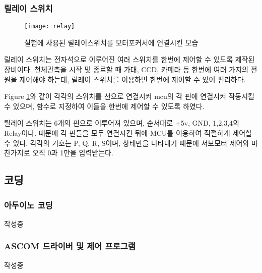 

\subsubsection{릴레이 스위치}

\begin{figure}[h]
	\begin{center}
		\texttt{[image: relay]}
	\end{center}
	\caption{실험에 사용된 릴레이스위치를 모터포커서에 연결시킨 모습}
	\label{relay}
\end{figure}


릴레이 스위치는 전자석으로 이루어진 여러 스위치를 한번에 제어할 수 있도록 제작된 장비이다. 천체관측을 시작 및 종료할 때 가대, CCD, 카메라 등 한번에 여러 가지의 전원을 제어해야 하는데, 릴레이 스위치를 이용하면 한번에 제어할 수 있어 편리하다. 


\textrm{Figure} \ref{relay}와 같이 각각의 스위치를 선으로 연결시켜 mcu의 각 핀에 연결시켜 작동시킬 수 있으며, 함수로 지정하여 이들을 한번에 제어할 수 있도록 하였다.

릴레이 스위치는 6개의 핀으로 이루어져 있으며, 순서대로 +5v, GND, 1,2,3,4의 Relay이다. 때문에 각 핀들을 모두 연결시킨 뒤에 MCU를 이용하여 적절하게 제어할 수 있다. 각각의 기호는 P, Q, R, S이며, 상태만을 나타내기 때문에 서보모터 제어와 마찬가지로 오직 0과 1만을 입력받는다.


\subsection{코딩}

\subsubsection{아두이노 코딩}

작성중

\subsubsection{ASCOM 드라이버 및 제어 프로그램}

작성중
